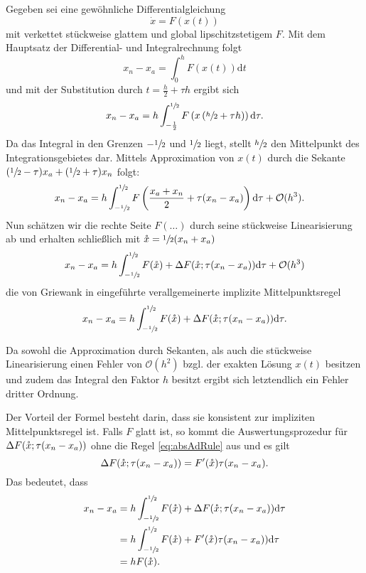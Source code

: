 Gegeben sei eine gewöhnliche Differentialgleichung
\[
 \dot x = F(x(t))
\]
mit verkettet stückweise glattem und global lipschitzstetigem $F$. Mit dem Hauptsatz der Differential- und Integralrechnung folgt
\[
 x_n - x_a = \int_0^h F(x(t)) \text{d}t
\]
und mit der Substitution durch $t = \frac{h}{2} + \tau h$ ergibt sich
\[
 x_n - x_a = h\int_{-\frac{1}{2}}^{\sfrac{1}{2}} F\left(x \left(\sfrac{h}{2} + \tau h\right)\right) \text{d}\tau.
\]
Da das Integral in den Grenzen $-\sfrac{1}{2}$ und $\sfrac{1}{2}$ liegt, stellt $\sfrac{h}{2}$ den Mittelpunkt des Integrationsgebietes dar. Mittels Approximation von $x(t)$ durch die Sekante $(\sfrac{1}{2} - \tau) x_a + (\sfrac{1}{2} + \tau) x_n$ folgt:
\[
 \begin{aligned}
 x_n - x_a & = h\int_{-\sfrac{1}{2}}^{\sfrac{1}{2}} F\left(\frac{x_a + x_n}{2} + \tau (x_n - x_a)\right) \text{d}\tau + \mathcal O(h^3).
 \end{aligned}
\]
Nun schätzen wir die rechte Seite $F(\ldots)$ durch seine stückweise Linearisierung ab und erhalten schließlich mit $\mathring{x} = \sfrac{1}{2}(x_n+x_a)$
\[
 x_n -  x_a = h\int_{-\sfrac{1}{2}}^{\sfrac{1}{2}} F(\mathring{x}) + \Delta F(\mathring{x};\tau (x_n - x_a))  \text{d}\tau + \mathcal O(h^3)
\]
die von Griewank in \cite[S.21 (14)]{monster} eingeführte verallgemeinerte implizite Mittelpunktsregel
\begin{equation}
 x_n -  x_a = h\int_{-\sfrac{1}{2}}^{\sfrac{1}{2}} F(\mathring{x}) + \Delta F(\mathring{x};\tau (x_n - x_a))  \text{d}\tau.
 \label{eq:genMidpointRule}
\end{equation}

Da sowohl die Approximation durch Sekanten, als auch die stückweise Linearisierung einen Fehler von $\mathcal O(h^2)$ bzgl. der exakten Lösung $x(t)$ besitzen und zudem das Integral den Faktor $h$ besitzt ergibt sich letztendlich ein Fehler dritter Ordnung.

Der Vorteil der Formel besteht darin, dass sie konsistent zur impliziten Mittelpunktsregel ist. Falls $F$ glatt ist, so kommt die Auswertungsprozedur für $\Delta F(\mathring{x};\tau (x_n - x_a))$ ohne die Regel \eqref{eq:absAdRule} aus und es gilt 
\[
 \Delta F(\mathring{x};\tau (x_n - x_a)) = F'(\mathring{x}) \tau (x_n - x_a).
\]
Das bedeutet, dass
\begin{equation}
\begin{aligned}
   x_n -  x_a &= h\int_{-\sfrac{1}{2}}^{\sfrac{1}{2}} F(\mathring{x}) + \Delta F(\mathring{x};\tau (x_n - x_a))  \text{d}\tau\\
		    &= h\int_{-\sfrac{1}{2}}^{\sfrac{1}{2}} F(\mathring{x}) + F'(\mathring{x})\tau (x_n - x_a))  \text{d}\tau\\
		    &= h F(\mathring{x}).
\end{aligned}
\label{eq:equivalenceGenImplMidpoint}
\end{equation}

